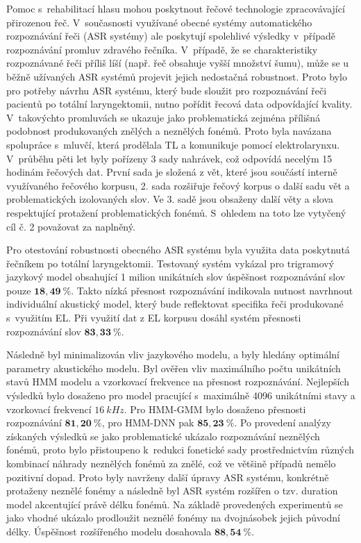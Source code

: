 Pomoc s~rehabilitací hlasu mohou poskytnout řečové technologie zpracovávající přirozenou řeč. V~současnosti využívané obecné systémy automatického rozpoznávání řeči (ASR systémy) ale poskytují spolehlivé výsledky v~případě rozpoznávání promluv zdravého řečníka. V~případě, že se charakteristiky rozpoznávané řeči příliš líší (např. řeč obsahuje vyšší množství šumu), může se u běžně užívaných ASR systémů projevit jejich nedostačná robustnost. Proto bylo pro potřeby návrhu ASR systému, který bude sloužit pro rozpoznávání řeči pacientů po totální laryngektomii, nutno pořídit řecová data odpovídající kvality. V~takovýchto promluvách se ukazuje jako problematická zejména přílišná podobnost produkovaných znělých a neznělých fonémů. Proto byla navázana spolupráce s~mluvčí, která prodělala TL a komunikuje pomocí elektrolarynxu. V~průběhu pěti let byly pořízeny 3 sady nahrávek, což odpovídá necelým 15 hodinám řečových dat. První sada je složená z vět, které jsou součástí interně využívaného řečového korpusu, 2. sada rozšiřuje řečový korpus o další sadu vět a problematických izolovaných slov. Ve 3. sadě jsou obsaženy další věty a slova respektující protažení problematických fonémů.
S~ohledem na toto lze vytyčený cíl č. 2 považovat za naplněný.

Pro otestování robustnosti obecného ASR systému byla využita data poskytnutá řečníkem po totální laryngektomii. Testovaný systém vykázal pro trigramový jazykový model obsahující 1 milion unikátních slov úspěšnost rozpoznávání slov pouze $\boldsymbol{18,49~\%}$. Takto nízká přesnost rozpoznávání indikovala nutnost navrhnout individuální akustický model, který bude reflektovat specifika řeči produkované s~využitím EL. Při využití dat z EL korpusu dosáhl systém přesnosti rozpoznávání slov $\boldsymbol{83,33~\%}$.

Následně byl minimalizován vliv jazykového modelu,
a byly hledány optimální parametry akustického modelu. Byl ověřen vliv maximálního počtu unikátních stavů HMM modelu a vzorkovací frekvence na přesnost rozpoznávání. Nejlepších výsledků bylo dosaženo pro model pracující s~maximálně 4096 unikátními stavy a vzorkovací frekvencí $16\ kHz$. Pro HMM-GMM bylo dosaženo přesnosti rozpoznávání $\boldsymbol{81,20~\%}$, pro HMM-DNN pak $\boldsymbol{85,23~\%}$. Po provedení analýzy získaných výsledků se jako problematické ukázalo rozpoznávání neznělých fonémů, proto bylo přistoupeno  k~redukci fonetické sady prostřednictvím různých kombinací náhrady neznělých fonémů za znělé, což ve většině případů nemělo pozitivní dopad. Proto byly navrženy další úpravy ASR systému, konkrétně protaženy neznělé fonémy a následně byl ASR systém rozšířen o tzv. duration model akcentující právě délku fonémů. Na základě provedených experimentů se jako vhodné ukázalo prodloužit neznělé fonémy na dvojnásobek jejich původní délky. Úspěšnost rozšířeného modelu dosahovala $\boldsymbol{88,54~\%}$.

